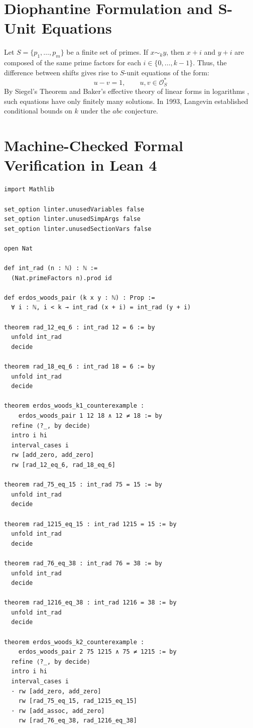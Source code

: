 \documentclass[11pt,a4paper]{article}
\theoremstyle{definition}
\begin{document}
\section{Diophantine Formulation and S-Unit Equations}

Let $S = \{p_1, \dots, p_m\}$ be a finite set of primes.
If $x \sim_k y$, then $x + i$ and $y + i$ are composed of the same prime factors for each $i \in \{0, \dots, k-1\}$.
Thus, the difference between shifts gives rise to $S$-unit equations of the form:
\[ u - v = 1, \qquad u, v \in \mathcal{O}_S^* \]
By Siegel's Theorem and Baker's effective theory of linear forms in logarithms \cite{baker1975}, such equations have only finitely many solutions.
In 1993, Langevin \cite{langevin1993} established conditional bounds on $k$ under the $abc$ conjecture.

\section{Machine-Checked Formal Verification in Lean 4}

\begin{lstlisting}[caption={Formal Lean 4 Implementation of Erdős-Woods Radical Properties}]
import Mathlib

set_option linter.unusedVariables false
set_option linter.unusedSimpArgs false
set_option linter.unusedSectionVars false

open Nat

def int_rad (n : ℕ) : ℕ :=
  (Nat.primeFactors n).prod id

def erdos_woods_pair (k x y : ℕ) : Prop :=
  ∀ i : ℕ, i < k → int_rad (x + i) = int_rad (y + i)

theorem rad_12_eq_6 : int_rad 12 = 6 := by
  unfold int_rad
  decide

theorem rad_18_eq_6 : int_rad 18 = 6 := by
  unfold int_rad
  decide

theorem erdos_woods_k1_counterexample :
    erdos_woods_pair 1 12 18 ∧ 12 ≠ 18 := by
  refine ⟨?_, by decide⟩
  intro i hi
  interval_cases i
  rw [add_zero, add_zero]
  rw [rad_12_eq_6, rad_18_eq_6]

theorem rad_75_eq_15 : int_rad 75 = 15 := by
  unfold int_rad
  decide

theorem rad_1215_eq_15 : int_rad 1215 = 15 := by
  unfold int_rad
  decide

theorem rad_76_eq_38 : int_rad 76 = 38 := by
  unfold int_rad
  decide

theorem rad_1216_eq_38 : int_rad 1216 = 38 := by
  unfold int_rad
  decide

theorem erdos_woods_k2_counterexample :
    erdos_woods_pair 2 75 1215 ∧ 75 ≠ 1215 := by
  refine ⟨?_, by decide⟩
  intro i hi
  interval_cases i
  · rw [add_zero, add_zero]
    rw [rad_75_eq_15, rad_1215_eq_15]
  · rw [add_assoc, add_zero]
    rw [rad_76_eq_38, rad_1216_eq_38]
\end{lstlisting}
\end{document}
